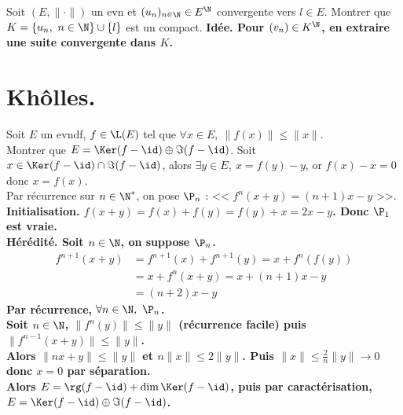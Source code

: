 \documentclass[11pt]{article}
\begin{document}
\begin{ex}{}{}
    Soit $(E,\|\cdot\|)$ un evn et $(u_n)_{n\in\N}\in E^\N$ convergente vers $l\in E$. Montrer que $K=\{u_n, ~ n\in\N\}\cup\{l\}$ est un compact.
    \tcblower
    \bf{Idée.} Pour $(v_n)\in K^\N$, en extraire une suite convergente dans $K$. 
\end{ex}

\fin

\pagebreak

\section{Khôlles.}

\begin{exercice}{}{}
    Soit $E$ un evndf, $f\in\L(E)$ tel que $\forall x \in E, ~ \|f(x)\|\leq\|x\|$.\\
    Montrer que $E=\Ker(f-\id)\oplus\Im(f-\id)$.
    \tcblower
    Soit $x\in\Ker(f-\id)\cap\Im(f-\id)$, alors $\exists y \in E, ~ x = f(y)-y$, or $f(x)-x=0$ donc $x=f(x)$.\\
    Par récurrence sur $n\in\N^*$, on pose $\P_n$ : << $f^n(x+y) = (n+1)x-y$ >>.\\
    \bf{Initialisation.} $f(x+y)=f(x)+f(y)=f(y)+x=2x-y$. Donc $\P_1$ est vraie.\\
    \bf{Hérédité.} Soit $n\in\N$, on suppose $\P_n$.
    \begin{align*}
        f^{n+1}(x+y)&=f^{n+1}(x)+f^{n+1}(y)=x+f^n(f(y))\\
        &=x+f^n(x+y)=x+(n+1)x-y\\
        &=(n+2)x-y
    \end{align*}
    Par récurrence, $\forall n \in \N, ~ \P_n$.\\
    Soit $n\in\N$, $\|f^n(y)\|\leq\|y\|$ (récurrence facile) puis $\|f^{n-1}(x+y)\|\leq\|y\|$.\\
    Alors $\|nx+y\|\leq\|y\|$ et $n\|x\|\leq2\|y\|$. Puis $\|x\|\leq\frac{2}{n}\|y\|\to0$ donc $x=0$ par séparation.\\
    Alors $E=\rg(f-\id)+\dim\Ker(f-\id)$, puis par caractérisation, $E=\Ker(f-\id)\oplus\Im(f-\id)$.
\end{exercice}
\end{document}
